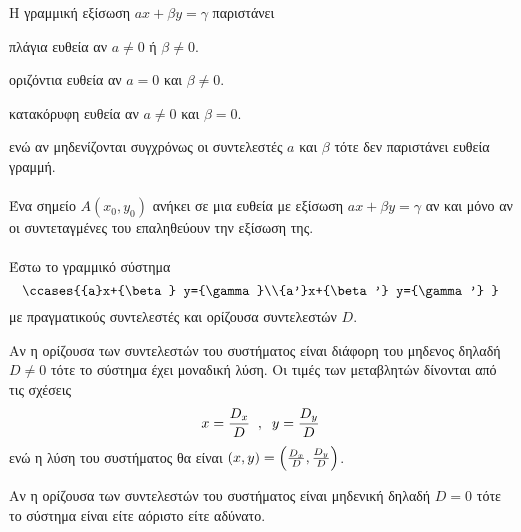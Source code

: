 \documentclass[twoside,nofonts,internet,shmeiwseis]{thewria}
\DeclareRobustCommand{\frac}[3][0pt]{%
{\begingroup\hspace{#1}#2\hspace{#1}\endgroup\over\hspace{#1}#3\hspace{#1}}}
\begin{document}
\thewrhmata
{}
Η γραμμική εξίσωση $ ax+\beta y=\gamma $ παριστάνει
\begin{rlist}
\item πλάγια ευθεία αν $ a\neq0 $ ή $ \beta\neq0 $.
\item οριζόντια ευθεία αν $ a=0 $ και $ \beta\neq0 $.
\item κατακόρυφη ευθεία αν $ a\neq0 $ και $ \beta=0 $.
\end{rlist}
ενώ αν μηδενίζονται συγχρόνως οι συντελεστές $ a $ και $ \beta $ τότε δεν παριστάνει ευθεία γραμμή.\\\\
Ένα σημείο $ A(x_0,y_0) $ ανήκει σε μια ευθεία με εξίσωση $ ax+\beta y=\gamma $ αν και μόνο αν οι συντεταγμένες του επαληθεύουν την εξίσωση της.\\\\
Έστω το γραμμικό σύστημα 
\[ \ccases{{a}x+{\beta} y={\gamma}\\{a'}x+{\beta'} y={\gamma'} } \]
με πραγματικούς συντελεστές και ορίζουσα συντελεστών $ D $.
\begin{rlist}
\item Αν η ορίζουσα των συντελεστών του συστήματος είναι διάφορη του μηδενος δηλαδή $ D\neq0 $ τότε το σύστημα έχει μοναδική λύση. Οι τιμές των μεταβλητών δίνονται από τις σχέσεις
\[ x=\frac{D_x}{D}\;\;,\;\;y=\frac{D_y}{D} \]
ενώ η λύση του συστήματος θα είναι $ (x,y)=\left(\frac{D_x}{D},\frac{D_y}{D} \right)  $.
\item Αν η ορίζουσα των συντελεστών του συστήματος είναι μηδενική δηλαδή $ D=0 $ τότε το σύστημα είναι είτε αόριστο είτε αδύνατο.
\end{rlist}
\end{document}
